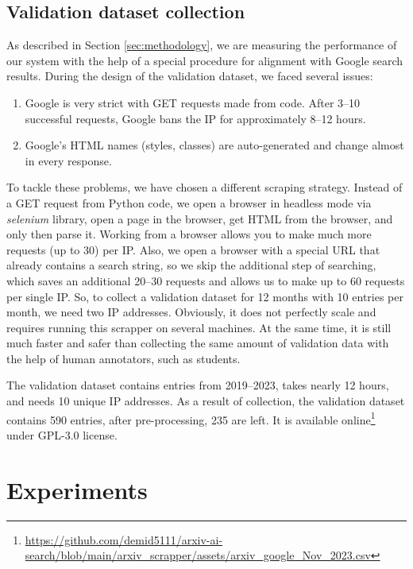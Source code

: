 \documentclass{article}
\begin{document}
    
    \subsection{Validation dataset collection}

        As described in Section \ref{sec:methodology}, we are measuring the performance of our system with the help of a special procedure for alignment with Google search results. During the design of the validation dataset, we faced several issues:
        
        \begin{enumerate}
            \item Google is very strict with GET requests made from code. After 3--10 successful requests, Google bans the IP for approximately 8--12 hours.
            \item Google's HTML names (styles, classes) are auto-generated and change almost in every response. 
        \end{enumerate}

        To tackle these problems, we have chosen a different scraping strategy. Instead of a GET request from Python code, we open a browser in headless mode via \textit{selenium} library, open a page in the browser, get HTML from the browser, and only then parse it. Working from a browser allows you to make much more requests (up to 30) per IP. Also, we open a browser with a special URL that already contains a search string, so we skip the additional step of searching, which saves an additional 20--30 requests and allows us to make up to 60 requests per single IP. So, to collect a validation dataset for 12 months with 10 entries per month, we need two IP addresses. Obviously, it does not perfectly scale and requires running this scrapper on several machines. At the same time, it is still much faster and safer than collecting the same amount of validation data with the help of human annotators, such as students.

        The validation dataset contains entries from 2019--2023, takes nearly 12 hours, and needs 10 unique IP addresses. As a result of collection, the validation dataset contains 590 entries, after pre-processing, 235 are left. It is available online\footnote{\url{https://github.com/demid5111/arxiv-ai-search/blob/main/arxiv_scrapper/assets/arxiv_google_Nov_2023.csv}} under GPL-3.0 license.

\section{Experiments}
\end{document}
